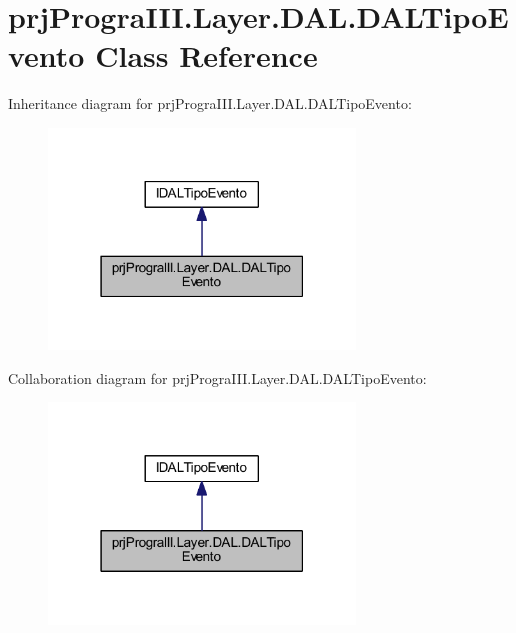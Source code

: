 \hypertarget{classprj_progra_i_i_i_1_1_layer_1_1_d_a_l_1_1_d_a_l_tipo_evento}{}\section{prj\+Progra\+I\+I\+I.\+Layer.\+D\+A\+L.\+D\+A\+L\+Tipo\+Evento Class Reference}
\label{classprj_progra_i_i_i_1_1_layer_1_1_d_a_l_1_1_d_a_l_tipo_evento}


Inheritance diagram for prj\+Progra\+I\+I\+I.\+Layer.\+D\+A\+L.\+D\+A\+L\+Tipo\+Evento\+:
\nopagebreak
\begin{figure}[H]
\begin{center}
\leavevmode
\includegraphics[width=231pt]{classprj_progra_i_i_i_1_1_layer_1_1_d_a_l_1_1_d_a_l_tipo_evento__inherit__graph}
\end{center}
\end{figure}


Collaboration diagram for prj\+Progra\+I\+I\+I.\+Layer.\+D\+A\+L.\+D\+A\+L\+Tipo\+Evento\+:
\nopagebreak
\begin{figure}[H]
\begin{center}
\leavevmode
\includegraphics[width=231pt]{classprj_progra_i_i_i_1_1_layer_1_1_d_a_l_1_1_d_a_l_tipo_evento__coll__graph}
\end{center}
\end{figure}
